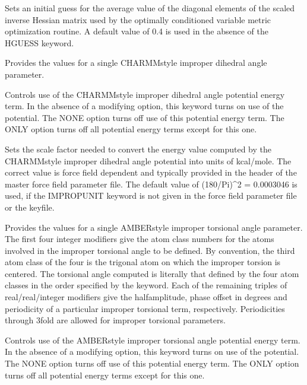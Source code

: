 \documentclass[letterpaper,11pt,english]{sphinxmanual}
\begin{document}
  Sets an initial guess for the average value of the diagonal elements of the scaled inverse Hessian matrix used by the optimally conditioned variable metric optimization routine. A default value of 0.4 is used in the absence of the HGUESS keyword.


  Provides the values for a single CHARMM\sphinxhyphen{}style improper dihedral angle parameter.

  Controls use of the CHARMM\sphinxhyphen{}style improper dihedral angle potential energy term. In the absence of a modifying option, this keyword turns on use of the potential. The NONE option turns off use of this potential energy term. The ONLY option turns off all potential energy terms except for this one.

  Sets the scale factor needed to convert the energy value computed by the CHARMM\sphinxhyphen{}style improper dihedral angle potential into units of kcal/mole. The correct value is force field dependent and typically provided in the header of the master force field parameter file. The default value of (180/Pi)\textasciicircum{}2 = 0.0003046 is used, if the IMPROPUNIT keyword is not given in the force field parameter file or the keyfile.

  Provides the values for a single AMBER\sphinxhyphen{}style improper torsional angle parameter. The first four integer modifiers give the atom class numbers for the atoms involved in the improper torsional angle to be defined. By convention, the third atom class of the four is the trigonal atom on which the improper torsion is centered. The torsional angle computed is literally that defined by the four atom classes in the order specified by the keyword. Each of the remaining triples of real/real/integer modifiers give the half\sphinxhyphen{}amplitude, phase offset in degrees and periodicity of a particular improper torsional term, respectively. Periodicities through 3\sphinxhyphen{}fold are allowed for improper torsional parameters.

  Controls use of the AMBER\sphinxhyphen{}style improper torsional angle potential energy term. In the absence of a modifying option, this keyword turns on use of the potential. The NONE option turns off use of this potential energy term. The ONLY option turns off all potential energy terms except for this one.
\end{document}
